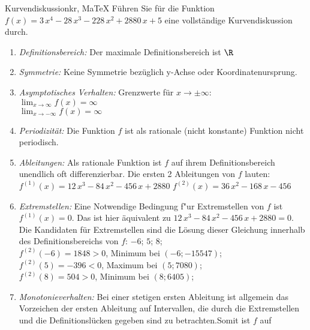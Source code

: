  \providecommand{\MoIl}{(} 
 \providecommand{\MoIr}{)}
 \providecommand{\MIntvlSep}{;} 
 \providecommand{\MElSetSep}{;} 
 \begin{MAufgabe}{Kurvendiskussion}{kr, MaTeX}
 F\"uhren Sie f\"ur die Funktion $f(x)=3\, x^4 - 28\, x^3 - 228\, x^2 + 2880\, x + 5$ eine vollst\"andige Kurvendiskussion durch.\\ 
 \ifLsg\Loesung
 \begin{enumerate}
 \item \emph{Definitionsbereich:} 
 Der maximale Definitionsbereich ist $\R$\item \emph{Symmetrie:} 
 Keine Symmetrie bez\"uglich y-Achse oder Koordinatenursprung.\item \emph{Asymptotisches Verhalten:} 
 Grenzwerte f\"ur $x\rightarrow \pm \infty$: \\ 
 $\lim_{x\rightarrow \infty} f(x)=\infty$ \\ 
 $\lim_{x\rightarrow -\infty} f(x)=\infty$ \\ 
 \item \emph{Periodizit\"at:} 
 Die Funktion $f$ ist als rationale (nicht konstante) Funktion nicht periodisch.\item \emph{Ableitungen:} 
 Als rationale Funktion ist $f$ auf ihrem Definitionsbereich unendlich oft differenzierbar. 
 Die ersten 2 Ableitungen von $f$ lauten: \\ 
 $f^{(1)}(x)=12\, x^3 - 84\, x^2 - 456\, x + 2880$\newline 
  $f^{(2)}(x)=36\, x^2 - 168\, x - 456$\newline 
  \item \emph{Extremstellen:} 
 Eine Notwendige Bedingung f"ur Extremstellen von $f$ ist $f^{(1)}(x)=0$. 
 Das ist hier \"aquivalent zu $12\, x^3 - 84\, x^2 - 456\, x + 2880=0$. 
 Die Kandidaten f\"ur Extremstellen sind die L\"osung dieser Gleichung innerhalb des Definitionsbereichs von $f$: $-6$; $5$; $8$; \\ 
 $f^{(2)}(-6)=1848$$>0$, Minimum bei $(-6;-15547)$; \\ 
 $f^{(2)}(5)=-396$$<0$, Maximum bei $(5;7080)$; \\ 
 $f^{(2)}(8)=504$$>0$, Minimum bei $(8;6405)$; \\ 
 \item \emph{Monotonieverhalten:} 
 Bei einer stetigen ersten Ableitung ist allgemein das Vorzeichen der ersten Ableitung auf Intervallen, die durch die Extremstellen und die Definitionsl\"ucken gegeben sind zu betrachten.Somit ist $f$ auf \\ 
$$
\end{enumerate}
\end{MAufgabe}
